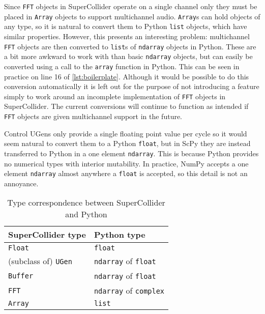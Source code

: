 \documentclass{article}
\begin{document}
Since \texttt{FFT} objects in SuperCollider operate on a single channel only they must be placed
in \texttt{Array} objects to support multichannel audio. \texttt{Array}s can hold objects of any
type, so it is natural to convert them to Python \texttt{list} objects, which have similar
properties. However, this presents an interesting problem: multichannel \texttt{FFT} objects are
then converted to \texttt{list}s of \texttt{ndarray} objects in Python. These are a bit more
awkward to work with than basic \texttt{ndarray} objects, but can easily be converted using a call
to the \texttt{array} function in Python. This can be seen in practice on line 16 of
\autoref{lst:boilerplate}. Although it would be possible to do this conversion
automatically it is left out for the purpose of not introducing a feature simply to work around an
incomplete implementation of \texttt{FFT} objects in SuperCollider. The current conversions will
continue to function as intended if \texttt{FFT} objects are given multichannel support in the
future.

Control UGens only provide a single floating point value per cycle so it would seem natural to
convert them to a Python \texttt{float}, but in ScPy they are instead transferred to Python in a
one element \texttt{ndarray}. This is because Python provides no numerical types with interior
mutability. In practice, NumPy accepts a one element \texttt{ndarray} almost anywhere a
\texttt{float} is accepted, so this detail is not an annoyance.

\begin{table}[ht]
    \caption{Type correspondence between SuperCollider and Python}
    \begin{center}
        \begin{tabular}{ll}
            \toprule
            SuperCollider type & Python type \\
            \midrule
            \texttt{Float} & \texttt{float} \\
            (subclass of) \texttt{UGen} & \texttt{ndarray} of \texttt{float} \\
            \texttt{Buffer} & \texttt{ndarray} of \texttt{float} \\
            \texttt{FFT} & \texttt{ndarray} of \texttt{complex} \\
            \texttt{Array} & \texttt{list} \\
            \bottomrule
        \end{tabular}
    \end{center}
\end{table}
\end{document}
